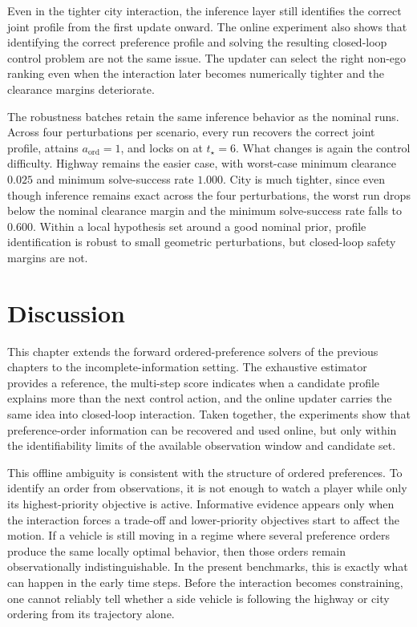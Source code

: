 Even in the tighter city interaction, the inference layer still identifies the correct joint profile from the first
update onward.
The online experiment also shows that identifying the correct preference profile and solving the
resulting closed-loop control problem are not the same issue. The updater can select the right non-ego ranking even when
the interaction later becomes numerically tighter and the clearance margins deteriorate.

The robustness batches retain the same inference behavior as the nominal runs.
Across four perturbations per scenario, every run recovers the correct joint profile, attains $a_{\mathrm{ord}} = 1$,
and locks on at $t_\star = 6$.
What changes is again the control difficulty.
Highway remains the easier case, with worst-case minimum clearance $0.025$ and minimum solve-success rate $1.000$.
City is much tighter, since even though inference remains exact across the four perturbations, the worst run drops below the
nominal clearance margin and the minimum solve-success rate falls to $0.600$.
Within a local hypothesis set around a good nominal prior, profile identification is robust to
small geometric perturbations, but closed-loop safety margins are not.

\section{Discussion}
\label{sec:inverse-discussion}

This chapter extends the forward ordered-preference solvers of the previous chapters to the
incomplete-information setting.
The exhaustive estimator provides a reference, the multi-step score indicates when a
candidate profile explains more than the next control action, and the online updater carries the
same idea into closed-loop interaction. Taken together, the experiments show that
preference-order information can be recovered and used online, but only within the
identifiability limits of the available observation window and candidate set.

This offline ambiguity is consistent with the structure of ordered preferences. To identify an order from observations,
it is not enough to watch a player while only its highest-priority objective is active. Informative evidence appears
only when the interaction forces a trade-off and lower-priority objectives start to affect the motion. If a vehicle is
still moving in a regime where several preference orders produce the same locally optimal behavior, then those orders
remain observationally indistinguishable. In the present benchmarks, this is exactly what can happen in the early time
steps. Before the interaction becomes constraining, one cannot reliably tell whether a side vehicle is following the
highway or city ordering from its trajectory alone.

